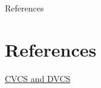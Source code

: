 \documentclass{beamer}
\begin{document}
%
%  




\begin{frame}{References}
  \section{References}
    
  \begin{thebibliography}{10}
    
%
	\href{https://www.appfusions.com/display/StashSCMImporter/CVCS+vs.+DVCS+In+a+Nutshell
}{CVCS and DVCS}
 
%    
%
  \end{thebibliography}
\end{frame}
\end{document}
